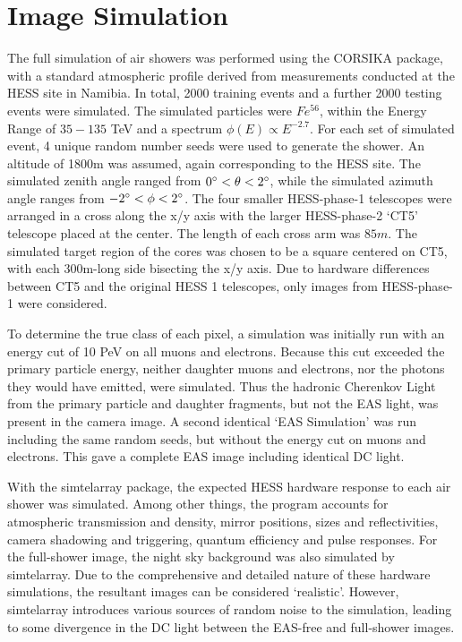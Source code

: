 \documentclass[]{article}
\begin{document}
\section{Image Simulation}
The full simulation of air showers was performed using the CORSIKA package, with a standard atmospheric profile derived from measurements conducted at the HESS site in Namibia. In total, 2000 training events and a further 2000 testing events were simulated. The simulated particles were $Fe^{56}$, within the Energy Range of $35-135$ TeV and a spectrum $\phi(E) \propto E^{-2.7}$. For each set of simulated event, 4 unique random number seeds were used to generate the shower. An altitude of 1800m was assumed, again corresponding to the HESS site. The simulated zenith angle ranged from $0\degree < \theta < 2 \degree$, while the simulated azimuth angle ranges from $-2\degree < \phi < 2 \degree$. The four smaller HESS-phase-1 telescopes were arranged in a cross along the x/y axis with the larger HESS-phase-2 \textquoteleft CT5' telescope placed at the center. The length of each cross arm was $85m$. The simulated target region of the cores was chosen to be a square centered on CT5, with each 300m-long side bisecting the x/y axis. Due to hardware differences between CT5 and the original HESS 1 telescopes, only images from HESS-phase-1 were considered.

To determine the true class of each pixel, a simulation was initially run with an energy cut of 10 PeV on all muons and electrons. Because this cut exceeded the primary particle energy, neither daughter muons and electrons, nor the photons they would have emitted, were simulated. Thus the hadronic Cherenkov Light from the primary particle and daughter fragments, but not the EAS light, was present in the camera image. A second identical \textquoteleft EAS Simulation' was run including the same random seeds, but without the energy cut on muons and electrons. This gave a complete EAS image including identical DC light.

With the sim\textunderscore telarray package, the expected HESS hardware response to each air shower was simulated. Among other things, the program accounts for atmospheric transmission and density, mirror positions, sizes and reflectivities, camera shadowing and triggering, quantum efficiency and pulse responses. For the full-shower image, the night sky background was also simulated by sim\textunderscore telarray. Due to the comprehensive and detailed nature of these hardware simulations, the resultant images can be considered \textquoteleft realistic'.  However, sim\textunderscore telarray introduces various sources of random noise to the simulation, leading to some divergence in the DC light between the EAS-free and full-shower images.
\end{document}
